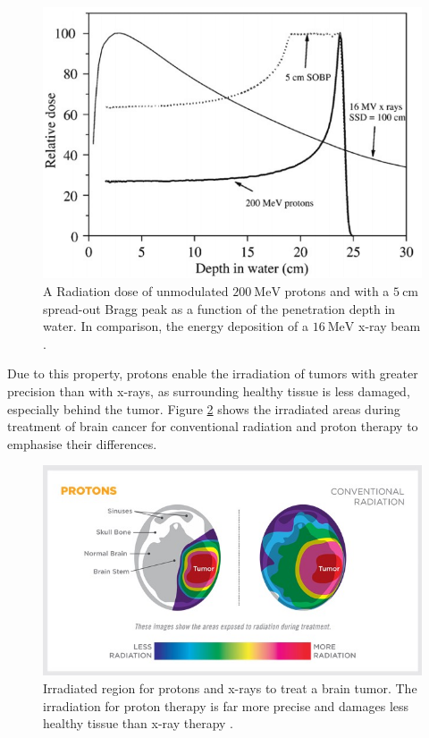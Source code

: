 \begin{figure}
  \centering
  \includegraphics[height=0.6\textwidth]{images/tiefendosis.png}
  \caption{A Radiation dose of unmodulated $\SI{200}{\mega\eV}$ protons and with a $\SI{5}{\centi\meter}$ spread-out Bragg peak
  as a function of the penetration depth in water. In comparison, the energy deposition of a $\SI{16}{\mega\eV}$ x-ray beam \cite{bragg}.}
  \label{fig:bragg}
\end{figure}
Due to this property, protons enable the irradiation of tumors with greater precision than with
x-rays, as surrounding healthy tissue is less damaged, especially behind the tumor. Figure \ref{fig:risk} shows the irradiated areas during treatment of brain cancer
for conventional radiation and
proton therapy to emphasise their differences.

\begin{figure}
  \centering
  \includegraphics[height=0.5\textwidth]{images/risk.png}
  \caption{Irradiated region for protons and x-rays to treat a brain tumor. The irradiation for proton therapy is far more precise and damages less healthy tissue than
  x-ray therapy \cite{brain}.}
  \label{fig:risk}
\end{figure}



